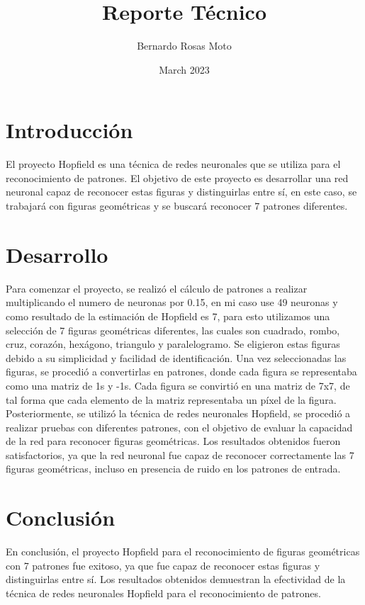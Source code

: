 \documentclass{article}
\title{Reporte Técnico}
\author{Bernardo Rosas Moto}
\date{March 2023}
\begin{document}
\maketitle

\section{Introducción}

El proyecto Hopfield es una técnica de redes neuronales que se utiliza para el reconocimiento de patrones. El objetivo de este proyecto es desarrollar una red neuronal capaz de reconocer estas figuras y distinguirlas entre sí, en este caso, se trabajará con figuras geométricas y se buscará reconocer 7 patrones diferentes.

\section{Desarrollo}

Para comenzar el proyecto, se realizó el cálculo de patrones a realizar multiplicando el numero de neuronas por 0.15, en mi caso use 49 neuronas y como resultado de la estimación de Hopfield es 7, para esto utilizamos una selección de 7 figuras geométricas diferentes, las cuales son cuadrado, rombo, cruz, corazón, hexágono, triangulo y paralelogramo. Se eligieron estas figuras debido a su simplicidad y facilidad de identificación. Una vez seleccionadas las figuras, se procedió a convertirlas en patrones, donde cada figura se representaba como una matriz de 1s y -1s. Cada figura se convirtió en una matriz de 7x7, de tal forma que cada elemento de la matriz representaba un píxel de la figura.
Posteriormente, se utilizó la técnica de redes neuronales Hopfield, se procedió a realizar pruebas con diferentes patrones, con el objetivo de evaluar la capacidad de la red para reconocer figuras geométricas. Los resultados obtenidos fueron satisfactorios, ya que la red neuronal fue capaz de reconocer correctamente las 7 figuras geométricas, incluso en presencia de ruido en los patrones de entrada.

\section{Conclusión}

En conclusión, el proyecto Hopfield para el reconocimiento de figuras geométricas con 7 patrones fue exitoso, ya que fue capaz de reconocer estas figuras y distinguirlas entre sí. Los resultados obtenidos demuestran la efectividad de la técnica de redes neuronales Hopfield para el reconocimiento de patrones.
\end{document}
